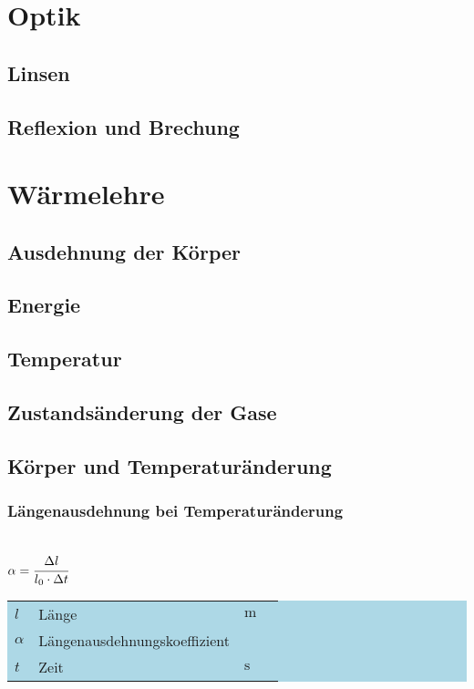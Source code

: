 \documentclass[a4paper, 11pt]{article}
\newcommand\mainformular[1]{\fbox{#1}}      %
\newcommand\legende[1]{
    \colorbox{lightblue}{%
    \begin{tabularx}{\textwidth}{llll}
     #1
    \end{tabularx}
    }
}                                           %
\begin{document}
\section{Optik}

\subsection{Linsen}


\subsection{Reflexion und Brechung}


\section{Wärmelehre}

\subsection{Ausdehnung der Körper}


\subsection{Energie}


\subsection{Temperatur}


\subsection{Zustandsänderung der Gase}


\subsection{Körper und Temperaturänderung}
\subsubsection{Längenausdehnung bei Temperaturänderung}
\begin{minipage}{0.45\textwidth}
\mainformular{$\Delta l = \alpha \cdot l_0 \cdot \Delta t$}  \\
$\alpha = \cfrac{\Delta l}{l_0 \cdot \Delta t}$
\end{minipage}
\begin{minipage}{0.45\textwidth}

\legende{
$l$ & Länge & $\si{\meter} $ & $ $ \\
$\alpha$ & Längenausdehnungskoeffizient &  & \\
$t$ & Zeit & $\si{\second}$ & \\
}

\end{minipage}
\end{document}
